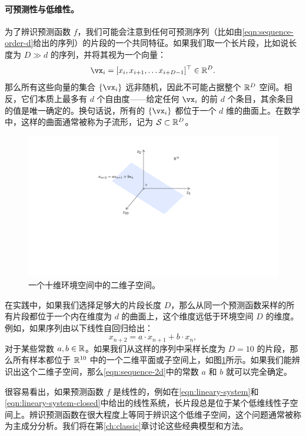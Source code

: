 \documentclass[../../book-main.tex]{subfiles}
\begin{document}
\paragraph{可预测性与低维性。}
为了辨识预测函数 $f$，我们可能会注意到任何可预测序列（比如由\eqref{eqn:sequence-order-d}给出的序列）的片段的一个共同特征。如果我们取一个长片段，比如说长度为 $D \gg d$ 的序列，并将其视为一个向量：
\begin{equation}
    \vx_i = [x_i, x_{i+1}, \ldots x_{i+D-1}]^\top \in \mathbb{R}^D.
\end{equation}
那么所有这些向量的集合 $\{\vx_i\}$ 远非随机，因此不可能占据整个 $\mathbb{R}^D$ 空间。相反，它们本质上最多有 $d$ 个自由度——给定任何 $\vx_i$ 的前 $d$ 个条目，其余条目的值是唯一确定的。换句话说，所有的 $\{\vx_i\}$ 都位于一个 $d$ 维的曲面上。在数学中，这样的曲面通常被称为子流形，记为 $\mathcal{S} \subset \mathbb{R}^D$。


\begin{figure}[t]
\centering
\includegraphics[width=0.6\linewidth]{figures/two-dimensional plane in R10.pdf}
    \caption{一个十维环境空间中的二维子空间。}
    \label{fig:lowdimplane}
\end{figure}
在实践中，如果我们选择足够大的片段长度 $D$，那么从同一个预测函数采样的所有片段都位于一个内在维度为 $d$ 的曲面上，这个维度远低于环境空间 $D$ 的维度。例如，如果序列由以下线性自回归给出：
\begin{equation}
    x_{n+2} = a\cdot x_{n+1} + b\cdot x_n,
    \label{eqn:sequence-2d}
\end{equation}
对于某些常数 $a, b \in \mathbb{R}$。如果我们从这样的序列中采样长度为 $D=10$ 的片段，那么所有样本都位于 $\mathbb{R}^{10}$ 中的一个二维平面或子空间上，如图\ref{fig:lowdimplane}所示。如果我们能辨识出这个二维子空间，那么\eqref{eqn:sequence-2d}中的常数 $a$ 和 $b$ 就可以完全确定。


很容易看出，如果预测函数 $f$ 是线性的，例如在\eqref{eqn:lineary-system}和\eqref{eqn:lineary-system-closed}中给出的线性系统，长片段总是位于某个低维线性子空间上。辨识预测函数在很大程度上等同于辨识这个低维子空间，这个问题通常被称为主成分分析。我们将在第\ref{ch:classic}章讨论这些经典模型和方法。
\end{document}
